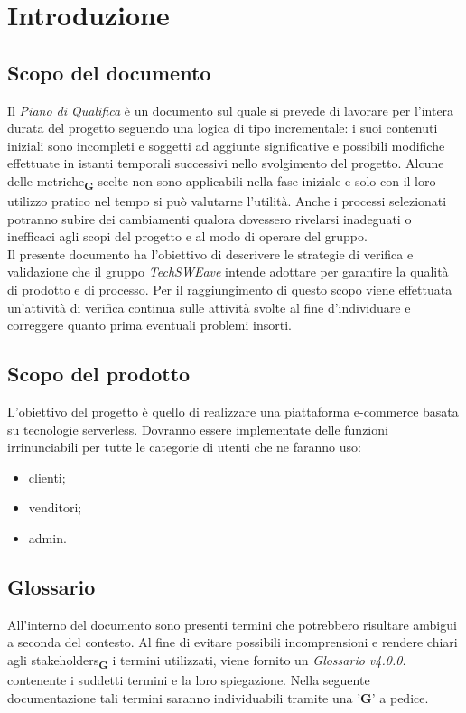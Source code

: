 \section{Introduzione}
\subsection{Scopo del documento}
Il \textit{Piano di Qualifica} è un documento sul quale si prevede di lavorare per l'intera durata del progetto seguendo una
logica di tipo incrementale: i suoi contenuti iniziali sono incompleti e soggetti ad aggiunte significative e possibili modifiche
effettuate in istanti temporali successivi nello svolgimento del progetto.
Alcune delle metriche\textsubscript{\textbf{G}} scelte non sono applicabili nella fase iniziale e solo con il loro utilizzo pratico nel tempo
si può valutarne l'utilità. Anche i processi selezionati potranno subire dei cambiamenti qualora dovessero rivelarsi
inadeguati o inefficaci agli scopi del progetto e al modo di operare del gruppo.\\
Il presente documento ha l'obiettivo di descrivere le strategie di verifica e validazione che il gruppo \textit{TechSWEave} intende
adottare per garantire la qualità di prodotto e di processo. Per il raggiungimento di questo scopo viene effettuata
un'attività di verifica continua sulle attività svolte al fine d'individuare e correggere quanto prima
eventuali problemi insorti.
\subsection{Scopo del prodotto}
L'obiettivo del progetto è quello di realizzare una piattaforma e-commerce basata su tecnologie serverless. Dovranno essere implementate delle funzioni irrinunciabili per tutte le categorie di utenti che ne faranno uso:
\begin{itemize}
    \item clienti;
    \item venditori;
    \item admin.
\end{itemize}
\subsection{Glossario}
All'interno del documento sono presenti termini che potrebbero risultare ambigui a seconda del contesto. Al fine di evitare possibili incomprensioni
e rendere chiari agli stakeholders\textsubscript{\textbf{G}} i termini utilizzati, viene fornito un \textit{Glossario v4.0.0.} contenente i suddetti termini
e la loro spiegazione. Nella seguente documentazione tali termini saranno individuabili tramite una '\textbf{G}' a pedice.
